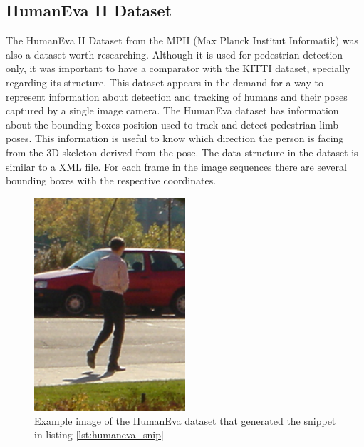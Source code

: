 \subsection{HumanEva II Dataset}
The HumanEva II Dataset from the MPII (Max Planck Institut Informatik) was also a dataset worth researching. Although it is used for pedestrian detection only, it was important to have a comparator with the KITTI dataset, specially regarding its structure. 
This dataset appears in the demand for a way to represent information about detection and tracking of humans and their poses captured by a single image camera. The HumanEva dataset has information about the bounding boxes position used to track and detect pedestrian limb poses. This information is useful to know which direction the person is facing from the 3D skeleton derived from the pose. The data structure in the dataset is similar to a XML file. For each frame in the image sequences there are several bounding boxes with the respective coordinates. \cite{Sigal}

\begin{figure}

\end{figure}

\begin{figure}[htp]
	
	\centering
	\includegraphics[width=0.5\textwidth]{capstate/imgs/00050.png}
	
	\caption{Example image of the HumanEva dataset that generated the snippet in listing \ref{lst:humaneva_snip} }
	\label{fig:00050}
	
\end{figure}

